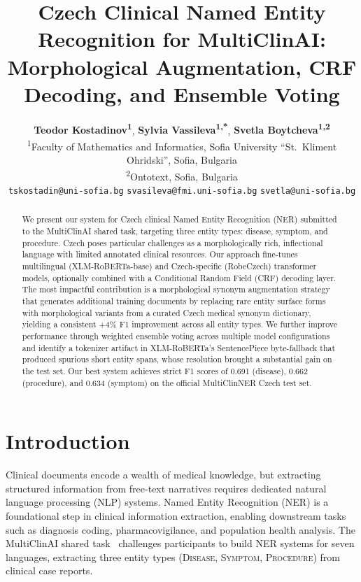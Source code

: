 \documentclass[11pt]{article}
\title{Czech Clinical Named Entity Recognition for MultiClinAI:\\
Morphological Augmentation, CRF Decoding, and Ensemble Voting}
\author{
  \textbf{Teodor Kostadinov\textsuperscript{1}},
  \textbf{Sylvia Vassileva\textsuperscript{1,*}},
  \textbf{Svetla Boytcheva\textsuperscript{1,2}}
\\[4pt]
  \textsuperscript{1}Faculty of Mathematics and Informatics,
    Sofia University ``St.\ Kliment Ohridski'', Sofia, Bulgaria \\
  \textsuperscript{2}Ontotext, Sofia, Bulgaria \\[4pt]
  \texttt{tskostadin@uni-sofia.bg} \quad
  \texttt{svasileva@fmi.uni-sofia.bg} \quad
  \texttt{svetla@uni-sofia.bg}
}
\begin{document}
\maketitle

\begin{abstract}
We present our system for Czech clinical Named Entity Recognition (NER) submitted to the MultiClinAI
shared task, targeting three entity types: disease, symptom, and procedure. Czech poses particular challenges
as a morphologically rich, inflectional language with limited annotated clinical resources. Our approach
fine-tunes multilingual (XLM-RoBERTa-base) and Czech-specific (RobeCzech) transformer models, optionally
combined with a Conditional Random Field (CRF) decoding layer. The most impactful contribution is a
morphological synonym augmentation strategy that generates additional training documents by replacing rare
entity surface forms with morphological variants from a curated Czech medical synonym dictionary, yielding
a consistent +4\% F1 improvement across all entity types. We further improve performance through weighted
ensemble voting across multiple model configurations and identify a tokenizer artifact in XLM-RoBERTa's
SentencePiece byte-fallback that produced spurious short entity spans, whose resolution brought a substantial
gain on the test set. Our best system achieves strict F1 scores of 0.691 (disease), 0.662 (procedure), and
0.634 (symptom) on the official MultiClinNER Czech test set.
\end{abstract}

\section{Introduction}

Clinical documents encode a wealth of medical knowledge, but extracting structured information from
free-text narratives requires dedicated natural language processing (NLP) systems. Named Entity Recognition
(NER) is a foundational step in clinical information extraction, enabling downstream tasks such as diagnosis
coding, pharmacovigilance, and population health analysis. The MultiClinAI shared task~\cite{multiclinai2026}
challenges participants to build NER systems for seven languages, extracting three entity types
(\textsc{Disease}, \textsc{Symptom}, \textsc{Procedure}) from clinical case reports.
\end{document}
